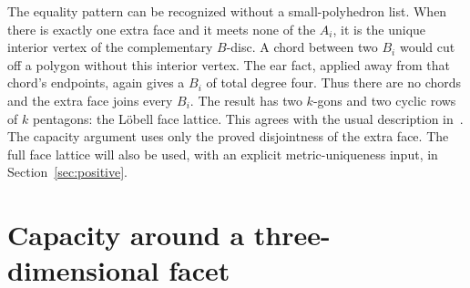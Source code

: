 \documentclass[11pt]{article}
\theoremstyle{remark}
\begin{document}
The equality pattern can be recognized without a small-polyhedron list.
When there is exactly one extra face and it meets none of the $A_i$,
it is the unique interior vertex of the complementary $B$-disc. A chord
between two $B_i$ would cut off a polygon without this interior vertex.
The ear fact, applied away from that chord's endpoints, again gives a
$B_i$ of total degree four. Thus there are no chords and the extra face
joins every $B_i$. The result has two $k$-gons and two cyclic rows of
$k$ pentagons: the L\"obell face lattice. This agrees with the usual
description in~\cite[p.~17 of the author's version]{KK}. The capacity
argument uses only the proved disjointness of the extra face. The full
face lattice will also be used, with an explicit metric-uniqueness
input, in Section~\ref{sec:positive}.

\section{Capacity around a three-dimensional facet}
\end{document}
